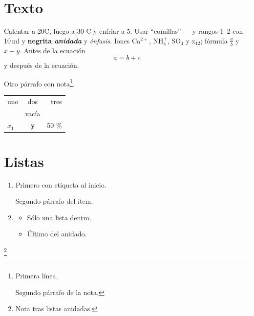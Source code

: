 


\section{Texto}
Calentar a 20\degree C, luego a 30\degree{} C y enfriar a 5\degree.
Usar ``comillas'' --- y rangos 1--2 con 10\,ml y \textbf{negrita \textit{anidada}} y \emph{énfasis}.
Iones Ca$^{2+}$, NH$_4^+$, SO$_{4}$ y x$_{12}$; fórmula $\frac{a}{b}$ y \(x+y\).
Antes de la ecuación
\[
	a = b + c
\]
y después de la ecuación.

Otro párrafo con nota\footnote{Primera línea.

Segundo párrafo de la nota.}.

\begin{tabular}{lcr}
uno & dos & tres \\
 & vacía & \\
$x_1$ & \textbf{y} & 50 \% \\
\end{tabular}

\section{Listas}
\begin{enumerate}
	\item \label{itm:caso:a}Primero con etiqueta al inicio.

	Segundo párrafo del ítem.
	\item
	\begin{itemize}
		\item Sólo una lista dentro.
		\item Último del anidado.
	\end{itemize}
\end{enumerate}\footnote{Nota tras listas anidadas.}
